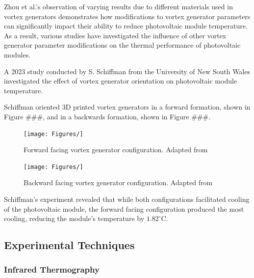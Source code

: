Zhou et al.'s observation of varying results due to different materials used in vortex generators demonstrates how modifications to vortex generator parameters can significantly impact their ability to reduce photovoltaic module temperature. \cite{Zhou2024Long-termCooling} As a result, various studies have investigated the influence of other vortex generator parameter modifications on the thermal performance of photovoltaic modules.

A 2023 study conducted by S. Schiffman from the University of New South Wales investigated the effect of vortex generator orientation on photovoltaic module temperature.\par
Schiffman oriented 3D printed vortex generators in a forward formation, shown in Figure ###, and in a backwards formation, shown in Figure ###.\cite{Schiffmann2023AnConditions}

\begin{figure}[H]
    \centering
    \begin{minipage}[b]{0.45\linewidth}
        \centering
        \texttt{[image: Figures/]}
        \caption{Forward facing vortex generator configuration. Adapted from \cite{Schiffmann2023AnConditions}}
        \label{fig:fwd_full_fomation}
    \end{minipage}
    \hfill
    \begin{minipage}[b]{0.45\linewidth}
        \centering
        \texttt{[image: Figures/]}
        \caption{Backward facing vortex generator configuration. Adapted from \cite{Schiffmann2023AnConditions}}
        \label{fig:back_full_formation}
    \end{minipage}
\end{figure}

Schiffman's experiment revealed that while both configurations facilitated cooling of the photovoltaic module, the forward facing configuration produced the most cooling, reducing the module's temperature by $1.82^\circ \text{C}$.\par



\pagebreak
\subsection{Experimental Techniques}
\subsubsection{Infrared Thermography}
